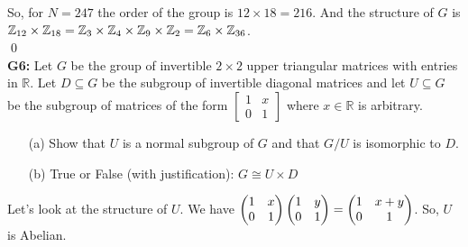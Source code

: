 So, for $ N=247 $ the order of the group is $ 12\times 18=216 $. And the structure of $ G $ is $ \mathbb{Z}_{12} \times \mathbb{Z}_{18}= \mathbb{Z}_{3}\times \mathbb{Z}_4 \times \mathbb{Z}_9 \times \mathbb{Z}_2 = \mathbb{Z}_{6}\times \mathbb{Z}_{36}$.\\
\qed\\
\textbf{G6:} Let $G$ be the group of invertible $2 \times 2$ upper triangular matrices with entries in $\mathbb{R}$. Let $D \subseteq G$ be the subgroup of invertible diagonal matrices and let $U \subseteq G$ be the subgroup of matrices of the form $\left[\begin{array}{ll}1 & x \\ 0 & 1\end{array}\right]$ where $x \in \mathbb{R}$ is arbitrary.
\begin{itemize}
	\item[(a)] Show that $U$ is a normal subgroup of $G$ and that $G / U$ is isomorphic to $D$.
	\item[(b)] True or False (with justification): $G \cong U \times D$
\end{itemize}
\soln
Let's look at the structure of $ U $. We have $ \begin{pmatrix} 1 & x\\ 0 & 1 \end{pmatrix}\begin{pmatrix} 1 & y\\ 0 & 1 \end{pmatrix}= \begin{pmatrix} 1 & x+y\\ 0 & 1 \end{pmatrix} $. So, $ U $ is Abelian.

